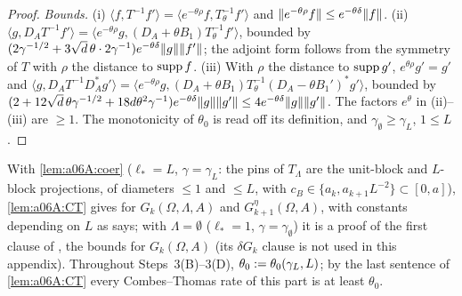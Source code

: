 \begin{proof}
\emph{Bounds.} (i) $\langle f,T^{-1}f'\rangle=\langle e^{-\theta\rho}f,T_\theta^{-1}f'\rangle$ and $\lVert e^{-\theta\rho}f\rVert\le e^{-\theta\delta}\lVert f\rVert$. (ii) $\langle g,D_AT^{-1}f'\rangle=\langle e^{-\theta\rho}g,(D_A+\theta B_1)T_\theta^{-1}f'\rangle$, bounded by $(2\gamma^{-1/2}+3\sqrt d\,\theta\cdot2\gamma^{-1})e^{-\theta\delta}\lVert g\rVert\lVert f'\rVert$; the adjoint form follows from the symmetry of $T$ with $\rho$ the distance to $\operatorname{supp} f$. (iii) With $\rho$ the distance to $\operatorname{supp} g'$, $e^{\theta\rho}g'=g'$ and $\langle g,D_AT^{-1}D_A^*g'\rangle=\langle e^{-\theta\rho}g,(D_A+\theta B_1)T_\theta^{-1}(D_A-\theta B_1')^*g'\rangle$, bounded by $(2+12\sqrt d\,\theta\gamma^{-1/2}+18d\theta^2\gamma^{-1})e^{-\theta\delta}\lVert g\rVert\lVert g'\rVert\le4e^{-\theta\delta}\lVert g\rVert\lVert g'\rVert$. The factors $e^\theta$ in (ii)--(iii) are $\ge1$. The monotonicity of $\theta_0$ is read off its definition, and $\gamma_\emptyset\ge\gamma_L$, $1\le L$.
\end{proof}

With \cref{lem:a06A:coer} ($\ell_*=L$, $\gamma=\gamma_L$: the pins of $T_\Lambda$ are the unit-block and $L$-block projections, of diameters $\le1$ and $\le L$, with $c_B\in\{a_k,a_{k+1}L^{-2}\}\subset[0,a]$), \cref{lem:a06A:CT} gives \cite[Cor.~2.3]{Ba4} for $G_k(\Omega,\Lambda,A)$ and $G^\eta_{k+1}(\Omega,A)$, with constants depending on $L$ as \cite[p.~588]{Ba4} says; with $\Lambda=\emptyset$ ($\ell_*=1$, $\gamma=\gamma_\emptyset$) it is a proof of the first clause of \cite[Cor.~2.3]{Ba4}, the bounds for $G_k(\Omega,A)$ (its $\delta G_k$ clause is not used in this appendix). Throughout Steps~3(B)--3(D), $\theta_0:=\theta_0(\gamma_L,L)$; by the last sentence of \cref{lem:a06A:CT} every Combes--Thomas rate of this part is at least $\theta_0$.


